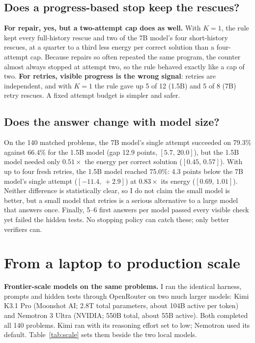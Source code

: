\documentclass[11pt,a4paper]{article}
\begin{document}
\subsection{Does a progress-based stop keep the rescues?}
\textbf{For repair, yes, but a two-attempt cap does as well.} With $K=1$, the rule kept every full-history rescue and two of the 7B model's four short-history rescues, at a quarter to a third less energy per correct solution than a four-attempt cap. Because repairs so often repeated the same program, the counter almost always stopped at attempt two, so the rule behaved exactly like a cap of two. \textbf{For retries, visible progress is the wrong signal}: retries are independent, and with $K=1$ the rule gave up 5 of 12 (1.5B) and 5 of 8 (7B) retry rescues. A fixed attempt budget is simpler and safer.

\subsection{Does the answer change with model size?}\label{sec:size}
On the 140 matched problems, the 7B model's single attempt succeeded on 79.3\% against 66.4\% for the 1.5B model (gap 12.9 points, $[5.7,\,20.0]$), but the 1.5B model needed only $0.51\times$ the energy per correct solution ($[0.45,\,0.57]$). With up to four fresh retries, the 1.5B model reached 75.0\%: 4.3 points below the 7B model's single attempt ($[-11.4,\,+2.9]$) at $0.83\times$ its energy ($[0.69,\,1.01]$). Neither difference is statistically clear, so I do not claim the small model is better, but a small model that retries is a serious alternative to a large model that answers once. Finally, 5--6 first answers per model passed every visible check yet failed the hidden tests. No stopping policy can catch these; only better verifiers can.

\section{From a laptop to production scale}\label{sec:production}
\textbf{Frontier-scale models on the same problems.} I ran the identical harness, prompts and hidden tests through OpenRouter on two much larger models: Kimi K3.1 Pro (Moonshot AI; 2.8T total parameters, about 104B active per token) and Nemotron 3 Ultra (NVIDIA; 550B total, about 55B active). Both completed all 140 problems. Kimi ran with its reasoning effort set to low; Nemotron used its default. Table~\ref{tab:scale} sets them beside the two local models.
\end{document}
